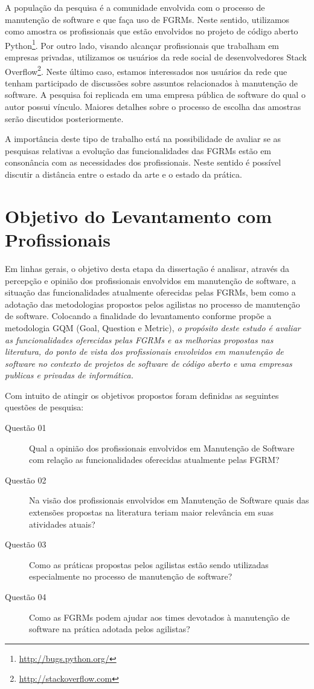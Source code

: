 A população da pesquisa é a comunidade envolvida com o processo de manutenção de
software e que faça uso de FGRMs. Neste sentido, utilizamos como amostra os
profissionais que estão envolvidos no projeto de código aberto
Python\footnote{\url{http://bugs.python.org/}}. Por outro lado, visando alcançar
profissionais que trabalham em empresas privadas, utilizamos os usuários da
rede social de desenvolvedores Stack
Overflow\footnote{\url{http://stackoverflow.com}}. Neste último caso, estamos
interessados nos usuários da rede que tenham participado de discussões sobre
assuntos relacionados à manutenção de software. A pesquisa foi replicada em uma
empresa pública de software do qual o autor possui vínculo. Maiores detalhes
sobre o processo de escolha das amostras serão discutidos posteriormente.

A importância deste tipo de trabalho está na possibilidade de avaliar se as
pesquisas relativas a evolução das funcionalidades das FGRMs estão em
consonância com as necessidades dos profissionais. Neste sentido é possível
discutir a distância entre o estado da arte e o estado da prática.

\section{Objetivo do Levantamento com Profissionais}
\label{sec:objetivo_da_pesquisa_com_profissionais}

Em linhas gerais, o objetivo desta etapa da dissertação é analisar, através da
percepção e opinião dos profissionais envolvidos em manutenção de software, a
situação das funcionalidades atualmente oferecidas pelas FGRMs, bem como a
adotação das metodologias propostos pelos agilistas no processo de manutenção de
software. Colocando a finalidade do levantamento conforme propõe a metodologia
GQM (Goal, Question e Metric)\cite{gqm}, \textit{o propósito deste estudo é
	avaliar as funcionalidades oferecidas pelas FGRMs e as melhorias propostas
	nas literatura, do ponto de vista dos
	profissionais envolvidos em manutenção de software no contexto de projetos
	de software de código aberto e uma empresas publicas e privadas de
	informática.}

Com intuito de atingir os objetivos propostos foram definidas as seguintes
questões de pesquisa:

\begin{description}
	\item[Questão 01] Qual a opinião dos profissionais envolvidos em Manutenção
		de Software com relação as funcionalidades oferecidas atualmente pelas
		FGRM\@?
	\item[Questão 02] Na visão dos profissionais envolvidos em Manutenção de
		Software quais das extensões propostas na literatura teriam maior
		relevância em suas atividades atuais?
	\item[Questão 03] Como as práticas propostas pelos agilistas estão sendo
	utilizadas especialmente no processo de manutenção de software?
	\item[Questão 04] Como as FGRMs podem ajudar aos times devotados à manutenção
	de software na prática adotada pelos agilistas?
\end{description}

